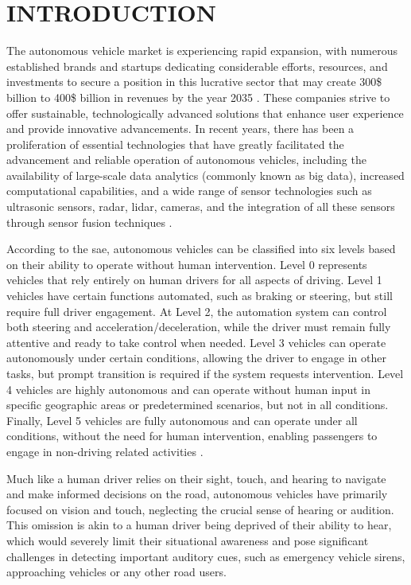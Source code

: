     \chapter{INTRODUCTION}
\label{chp:introduction}

The autonomous vehicle market is experiencing rapid expansion, with numerous established brands and startups dedicating considerable efforts, resources, and investments to secure a position in this lucrative sector that may create 300\$ billion to 400\$ billion in revenues by the year 2035 \cite{McKinsey2023}. These companies strive to offer sustainable, technologically advanced solutions that enhance user experience and provide innovative advancements. In recent years, there has been a proliferation of essential technologies that have greatly facilitated the advancement and reliable operation of autonomous vehicles, including the availability of large-scale data analytics (commonly known as big data), increased computational capabilities, and a wide range of sensor technologies such as ultrasonic sensors, \gls{radar}, \gls{lidar}, cameras, and the integration of all these sensors through sensor fusion techniques \cite{Hussainj2018}.

According to the \gls{sae}, autonomous vehicles can be classified into six levels based on their ability to operate without human intervention. Level 0 represents vehicles that rely entirely on human drivers for all aspects of driving. Level 1 vehicles have certain functions automated, such as braking or steering, but still require full driver engagement. At Level 2, the automation system can control both steering and acceleration/deceleration, while the driver must remain fully attentive and ready to take control when needed. Level 3 vehicles can operate autonomously under certain conditions, allowing the driver to engage in other tasks, but prompt transition is required if the system requests intervention. Level 4 vehicles are highly autonomous and can operate without human input in specific geographic areas or predetermined scenarios, but not in all conditions. Finally, Level 5 vehicles are fully autonomous and can operate under all conditions, without the need for human intervention, enabling passengers to engage in non-driving related activities \cite{SAE2021}.

Much like a human driver relies on their sight, touch, and hearing to navigate and make informed decisions on the road, autonomous vehicles have primarily focused on vision and touch, neglecting the crucial sense of hearing or audition. This omission is akin to a human driver being deprived of their ability to hear, which would severely limit their situational awareness and pose significant challenges in detecting important auditory cues, such as emergency vehicle sirens, approaching vehicles or any other road users.

